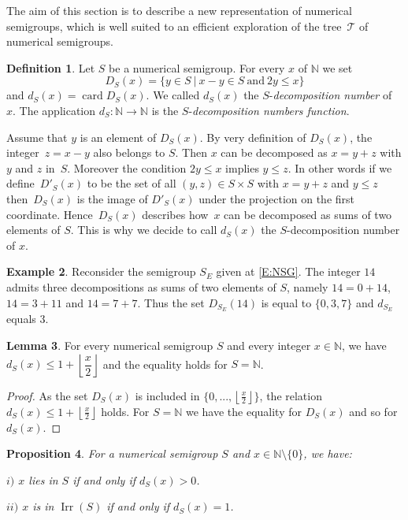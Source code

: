\documentclass[reqno,11pt]{amsart}
\theoremstyle{plain}
\newtheorem{prop}{Proposition}[section]
\theoremstyle{definition}
\newtheorem{defi}[prop]{Definition}
\newtheorem{exam}[prop]{Example}
\newtheorem{lem}[prop]{Lemma}
\renewcommand{\leq}{\leqslant}
\newcommand{\NN}{\mathbb{N}}
\DeclareMathOperator{\Irr}{Irr}
\DeclareMathOperator{\card}{card}
\begin{document}
The aim of this section is to describe a new representation of numerical semigroups,
which is well suited to an efficient exploration of the tree~$\mathcal{T}$ of numerical semigroups. 

\begin{defi}
Let $S$ be a numerical semigroup.
For every $x$ of $\NN$  we set
\[
D_S(x)=\{y \in S\ |\ x-y\in S\ \text{and}\ 2y\leq x\}
\]
and $d_S(x)=\card D_S(x)$.
We called $d_S(x)$ the $S$-\emph{decomposition number} of~$x$.
The application $d_S:\NN\to\NN$ is the $S$-\emph{decomposition numbers function}.
\end{defi}

Assume that $y$ is an element of $D_S(x)$.
By very definition of $D_S(x)$, the integer~$z=x-y$ also belongs to $S$. 
Then $x$ can be decomposed as $x=y+z$ with $y$ and $z$ in~$S$. 
Moreover the condition $2y\leq x$ implies $y\leq z$. 
In other words if we define~$D'_S(x)$ to be the set of all $(y,z)\in S\times S$ with $x=y+z$ and $y\leq z$ then~$D_S(x)$ is the image of $D'_S(x)$ under the projection on the first coordinate.
 Hence~$D_S(x)$ describes how~$x$ can be decomposed as sums of two elements of $S$.
 This is why we decide to call $d_S(x)$ the $S$-decomposition number of $x$.

\begin{exam}
Reconsider the semigroup $S_E$ given at \eqref{E:NSG}.
The integer $14$ admits three decompositions as sums of two elements of $S$, namely $14=0+14$, $14=3+11$ and $14=7+7$. 
Thus the set $D_{S_E}(14)$ is equal to $\{0,3,7\}$ and $d_{S_E}$ equals $3$.
\end{exam}


\begin{lem}
\label{L:RepN}
For every numerical semigroup $S$ and every integer $x\in \NN$,  we have $d_S(x)\leq 1+\left\lfloor \dfrac{x}2\right\rfloor$ and the equality holds for $S=\NN$.
\end{lem}

\begin{proof}
As the set $D_S(x)$ is included in $\{0,...,\left\lfloor\frac x2\right\rfloor\}$, the relation $d_S(x)\leq 1+\left\lfloor \frac{x}2\right\rfloor$ holds.
For $S=\NN$ we have the equality for $D_S(x)$ and so for $d_S(x)$.
\end{proof}


\begin{prop}
\label{P:Dandd}
For a numerical semigroup $S$ and $x\in\NN\setminus\{0\}$, we have:

 $i)$ $x$ lies in $S$ if and only if $d_S(x)>0$.

 $ii)$ $x$ is in $\Irr(S)$ if and only if $d_S(x)=1$.
\end{prop}
\end{document}
